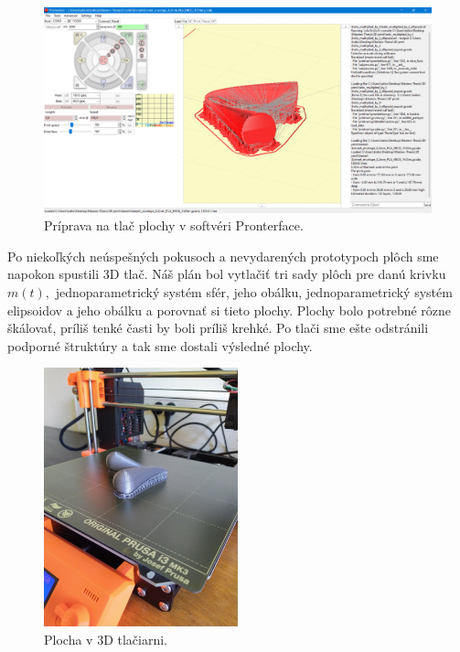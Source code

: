 \begin{figure}[h]
	\centering
	\includegraphics[width=\textwidth]{images/pronterface.png}
	\caption[Softvér Pronterface.]{Príprava na tlač plochy v softvéri Pronterface.}
	\label{fig:pronterface}
\end{figure}

Po niekoľkých neúspešných pokusoch a nevydarených prototypoch plôch sme napokon spustili 3D tlač. Náš plán bol vytlačiť tri sady plôch pre danú krivku $m(t),$ jednoparametrický systém sfér, jeho obálku, jednoparametrický systém elipsoidov a jeho obálku a porovnať si tieto plochy. Plochy bolo potrebné rôzne škálovať, príliš tenké časti by boli príliš krehké. Po tlači sme ešte odstránili podporné štruktúry a tak sme dostali výsledné plochy. 
\begin{figure}[h]
	\centering
	\includegraphics[angle=-90,width=0.5\textwidth]{images/plocha_v_tlaciarni.jpg}
	\caption[Plocha v 3D tlačiarni.]{Plocha v 3D tlačiarni.}
	\label{fig:plocha_v_tlaciarni}
\end{figure}